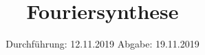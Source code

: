 

\subject{V802}
\title{Fouriersynthese}
\date{%
  Durchführung: 12.11.2019
  \hspace{3em}
  Abgabe: 19.11.2019
}



\maketitle
\thispagestyle{empty}
\tableofcontents
\newpage






\printbibliography{}



